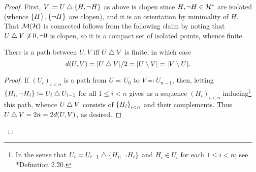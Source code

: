 \documentclass[reqno]{amsart}
\begin{document}
    \begin{proof}
        First, $V\coloneqq U\bigtriangleup\left\{H,\lnot H\right\}$ as above is clopen since $H,\lnot H\in\mathcal{H}^\ast$ are isolated (whence $\left\{H\right\},\left\{\lnot H\right\}$ are clopen), and it is an orientation by minimality of $H$. That $\mathcal{M}(\mathcal{H})$ is connected follows from the following claim by noting that $U\bigtriangleup V\not\ni0,\lnot0$ is clopen, so it is a compact set of isolated points, whence finite.
        \begin{center}
            \begin{minipage}{0.95\textwidth}
                \begin{claim*}
                    There is a path between $U,V$ iff $U\bigtriangleup V$ is finite, in which case
                    \begin{equation*}
                        d(U,V)=|U\bigtriangleup V|/2=|U\setminus V|=|V\setminus U|.
                    \end{equation*}
                \end{claim*}
                \begin{proof}
                    If $(U_i)_{i<n}$ is a path from $U\eqqcolon U_0$ to $V\eqqcolon U_{n-1}$, then, letting $\left\{H_i,\lnot H_i\right\}\coloneqq U_i\bigtriangleup U_{i-1}$ for all $1\leq i<n$ gives us a sequence $(H_i)_{i<n}$ inducing\footnote{In the sense that $U_i=U_{i-1}\bigtriangleup\left\{H_i,\lnot H_i\right\}$ and $H_i\in U_i$ for each $1\leq i<n$; see \cite{Tse20}*{Definition 2.20}.} this path, whence $U\bigtriangleup V$ consists of $\left\{H_i\right\}_{i<n}$ and their complements. Thus $U\bigtriangleup V=2n=2d(U,V)$, as desired.


\end{proof}
\end{minipage}
\end{center}
\end{proof}
\end{document}
